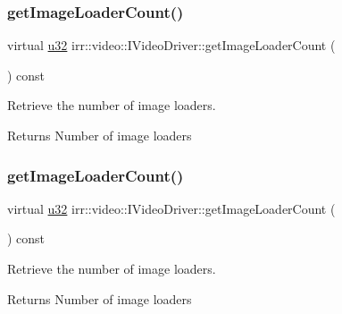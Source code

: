 \subsubsection{\texorpdfstring{get\+Image\+Loader\+Count()}{getImageLoaderCount()}\hspace{0.1cm}{\footnotesize\ttfamily [1/2]}}
{\footnotesize\ttfamily virtual \hyperlink{namespaceirr_a0416a53257075833e7002efd0a18e804}{u32} irr\+::video\+::\+I\+Video\+Driver\+::get\+Image\+Loader\+Count (\begin{DoxyParamCaption}{ }\end{DoxyParamCaption}) const\hspace{0.3cm}{\ttfamily [pure virtual]}}



Retrieve the number of image loaders. 

\begin{DoxyReturn}{Returns}
Number of image loaders 
\end{DoxyReturn}
\mbox{\label{classirr_1_1video_1_1IVideoDriver_a92535921ad01c90570533ba60b0b76b2}} 
\subsubsection{\texorpdfstring{get\+Image\+Loader\+Count()}{getImageLoaderCount()}\hspace{0.1cm}{\footnotesize\ttfamily [2/2]}}
{\footnotesize\ttfamily virtual \hyperlink{namespaceirr_a0416a53257075833e7002efd0a18e804}{u32} irr\+::video\+::\+I\+Video\+Driver\+::get\+Image\+Loader\+Count (\begin{DoxyParamCaption}{ }\end{DoxyParamCaption}) const\hspace{0.3cm}{\ttfamily [pure virtual]}}



Retrieve the number of image loaders. 

\begin{DoxyReturn}{Returns}
Number of image loaders 
\end{DoxyReturn}
\mbox{\label{classirr_1_1video_1_1IVideoDriver_acdc5e788993c117efebb22e155ab6a77}} 
